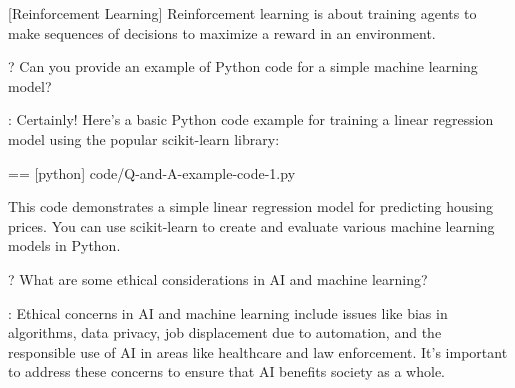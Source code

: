   [Reinforcement Learning]
    Reinforcement learning is about training agents to make sequences of decisions to maximize a reward in an environment.

?
  Can you provide an example of Python code for a simple machine learning model?

:
  Certainly! Here's a basic Python code example for training a linear regression model using the popular scikit-learn library:

  == [python] {code/Q-and-A-example-code-1.py}

  This code demonstrates a simple linear regression model for predicting housing prices. You can use scikit-learn to create and evaluate various machine learning models in Python.

?
  What are some ethical considerations in AI and machine learning?

:
  Ethical concerns in AI and machine learning include issues like bias in algorithms, data privacy, job displacement due to automation, and the responsible use of AI in areas like healthcare and law enforcement. It's important to address these concerns to ensure that AI benefits society as a whole.
